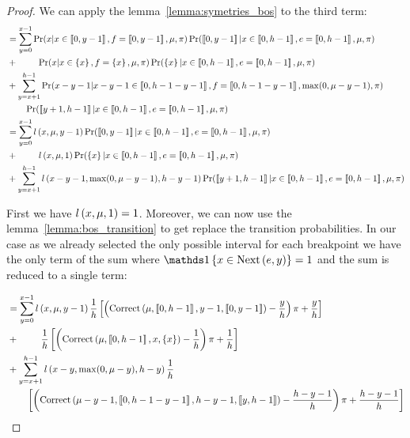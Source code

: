 \begin{proof}
We can apply the lemma~\ref{lemma:symetries_bos} to the third term:
\begin{align}
    &
    \begin{aligned}
        &=\sum_{y = 0}^{x - 1} \Pr(x | x \in \left\llbracket0, y - 1\right\rrbracket, f = \left\llbracket0, y - 1\right\rrbracket , \mu, \pi) \Pr(\left\llbracket0, y- 1\right\rrbracket | x \in \left\llbracket0, h - 1\right\rrbracket, e = \left\llbracket0, h - 1\right\rrbracket, \mu, \pi)\\
        &+\ \qquad \Pr(x | x \in \left\{ x \right\}, f = \left\{ x \right\}, \mu, \pi) \Pr(\left\{ x \right\} | x \in \left\llbracket0, h - 1\right\rrbracket, e = \left\llbracket0, h - 1\right\rrbracket, \mu, \pi)\\
        &+ \sum_{y = x + 1}^{h - 1} \Pr(x - y - 1 | x - y - 1\in \left\llbracket0, h - 1 - y - 1\right\rrbracket, f = \left\llbracket0, h - 1 - y - 1\right\rrbracket, \max(0, \mu - y - 1), \pi) \\
        &\qquad \Pr(\left\llbracket y + 1, h - 1\right\rrbracket | x \in \left\llbracket0, h - 1\right\rrbracket, e = \left\llbracket0, h - 1\right\rrbracket, \mu, \pi)
    \end{aligned} \\
    &
    \begin{aligned}
        &=\sum_{y = 0}^{x - 1} \mathnormal{l}\left(x, \mu, y - 1\right) \Pr(\left\llbracket0, y-1\right\rrbracket | x \in \left\llbracket0, h - 1\right\rrbracket, e = \left\llbracket0, h - 1\right\rrbracket, \mu, \pi)\\
        &+\ \qquad \mathnormal{l}\left(x, \mu, 1\right) \Pr(\left\{ x \right\} | x \in \left\llbracket0, h - 1\right\rrbracket, e = \left\llbracket0, h - 1\right\rrbracket, \mu, \pi)\\
        &+ \sum_{y = x + 1}^{h - 1}\mathnormal{l}\left(x - y - 1, \max(0, \mu - y - 1), h - y - 1\right) \Pr(\left\llbracket y + 1, h - 1\right\rrbracket | x \in \left\llbracket0, h - 1\right\rrbracket, e = \left\llbracket0, h - 1\right\rrbracket, \mu, \pi)
    \end{aligned} \\
\end{align}

First we have $\mathnormal{l}\left(x, \mu, 1\right) = 1$.
Moreover, we can now use the lemma~\ref{lemma:bos_transition} to get replace the transition probabilities. In our case as we already selected the only possible interval for each breakpoint we have the only term of the sum where $\indickronecker{x \in \nextes{e}{y}} = 1$ and the sum is reduced to a single term:

\begin{align}
    \begin{aligned}
        &=\sum_{y = 0}^{x - 1} \mathnormal{l}\left(x, \mu, y - 1\right) \frac{1}{h} \left[ \left( \text{Correct}\left(\mu, \left\llbracket0, h - 1\right\rrbracket, y - 1, \left\llbracket0, y - 1\right\rrbracket\right) - \frac{y}{h} \right) \pi + \frac{y}{h} \right] \\
        &+\ \qquad \frac{1}{h} \left[ \left(\text{Correct}\left(\mu, \left\llbracket0, h - 1\right\rrbracket, x, \left\{ x \right\}\right) - \frac{1}{h} \right) \pi + \frac{1}{h} \right] \\
        &+ \sum_{y = x + 1}^{h - 1}\mathnormal{l}\left(x - y, \max(0, \mu - y), h - y\right) \frac{1}{h}  \\
        &\qquad \left[ \left( \text{Correct}\left(\mu - y - 1, \left\llbracket0, h - 1 - y - 1\right\rrbracket, h - y - 1, \left\llbracket y, h - 1\right\rrbracket\right) - \frac{h - y - 1}{h} \right) \pi + \frac{h - y - 1}{h} \right]
    \end{aligned} \\ 
\end{align}


\end{proof}
